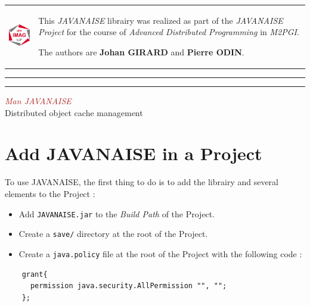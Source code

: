 \documentclass{article}
\newcommand*{\titleBC}{\begingroup %
\centering %

\def\CP{\textit{\Huge Man JAVANAISE}} %

\settowidth{\unitlength}{\CP} %
\textcolor{FireBrick}{\CP} \\[\baselineskip] %
{\color{Grey}\Large Distributed object cache management} \\ %
\endgroup}
\begin{document}
\begin{table}[h]
    \begin{center}
    \begin{tabular}{ >{\centering\arraybackslash}m{1.5in} >{\arraybackslash}m{4in} }

    \vspace{5mm} \includegraphics[width=2cm]{logo.jpg} & \vspace{9mm} This \textit{JAVANAISE} librairy was realized as part of the \textit{JAVANAISE Project} for the course of \textit{Advanced Distributed Programming} in \textit{M2PGI}.

The authors are \textbf{Johan GIRARD} and \textbf{Pierre ODIN}.

  \end{tabular}

  \label{tabular:UKJPNdata}
  \end{center}
\end{table}

\hrule\hrule

\vspace{1.5cm}

\titleBC

\vspace{1cm}

\section{Add JAVANAISE in a Project}

To use JAVANAISE, the first thing to do is to add the librairy and several elements to the Project :
\begin{itemize}
\item Add \texttt{JAVANAISE.jar} to the \textit{Build Path} of the Project.
\item Create a \texttt{save/} directory at the root of the Project.
\item Create a \texttt{java.policy} file at the root of the Project with the following code :
\end{itemize}

\noindent
\begin{verbatim}
    grant{
      permission java.security.AllPermission "", "";
    };
\end{verbatim}
\end{document}
